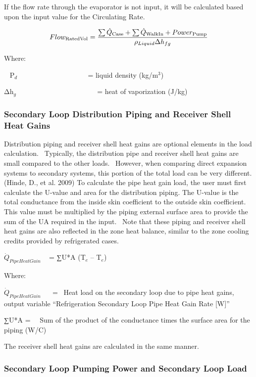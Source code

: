 If the flow rate through the evaporator is not input, it will be calculated based upon the input value for the Circulating Rate.

\begin{equation}
Flo{w_{{\rm{RatedVol}}}} = \frac{{\sum {{{\dot Q}_{{\rm{Case}}}} + \sum {{{\dot Q}_{{\rm{WalkIn}}}} + Powe{r_{{\rm{Pump}}}}} } }}{{{\rho_{Liquid}}\Delta {h_{fg}}}}
\end{equation}

Where:

~ Ρ\(_{d}\)~ ~~~~~~~~~~~~~~~~~~ = liquid density (kg/m\(^{3}\))

Δh\(_{g}\) ~~~~~~~~~~~~~~~~~~~~~~ = heat of vaporization (J/kg)

\subsubsection{Secondary Loop Distribution Piping and Receiver Shell Heat Gains}\label{secondary-loop-distribution-piping-and-receiver-shell-heat-gains}

Distribution piping and receiver shell heat gains are optional elements in the load calculation.~ Typically, the distribution pipe and receiver shell heat gains are small compared to the other loads.~ However, when comparing direct expansion systems to secondary systems, this portion of the total load can be very different. (Hinde, D., et al. 2009) To calculate the pipe heat gain load, the user must first calculate the U-value and area for the distribution piping. The U-value is the total conductance from the inside skin coefficient to the outside skin coefficient. This value must be multiplied by the piping external surface area to provide the sum of the UA required in the input.~ Note that these piping and receiver shell heat gains are also reflected in the zone heat balance, similar to the zone cooling credits provided by refrigerated cases.

\({\dot Q_{PipeHeatGain}}\) ~ = ∑U*A (T\(_{e}\) -- T\(_{e}\))

Where:

\({\dot Q_{PipeHeatGain}}\) ~~ = ~Heat load on the secondary loop due to pipe heat gains, output variable ``Refrigeration Secondary Loop Pipe Heat Gain Rate {[}W{]}''

∑U*A = ~~Sum of the product of the conductance times the surface area for the piping (W/C)

The receiver shell heat gains are calculated in the same manner.

\subsubsection{Secondary Loop Pumping Power and Secondary Loop Load}\label{secondary-loop-pumping-power-and-secondary-loop-load}

